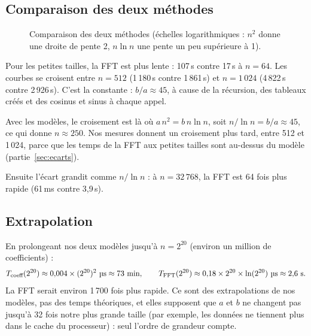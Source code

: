 \documentclass[11pt,a4paper]{article}
\newcommand{\us}{\,\textmu s\xspace}
\begin{document}
\subsection{Comparaison des deux méthodes}

\begin{figure}[H]
\centering
{}
\caption{Comparaison des deux méthodes (échelles logarithmiques : $n^2$ donne une
droite de pente 2, $n \ln n$ une pente un peu supérieure à 1).}
\label{fig:comparaison}
\end{figure}

Pour les petites tailles, la FFT est plus lente : 107\us contre 17\us à $n = 64$. Les
courbes se croisent entre $n = 512$ (1\,180\us contre 1\,861\us) et $n = 1\,024$
(4\,822\us contre 2\,926\us). C'est la constante : $b/a \approx 45$, à cause de la
récursion, des tableaux créés et des cosinus et sinus à chaque appel.

Avec les modèles, le croisement est là où $a\,n^2 = b\,n \ln n$, soit
$n / \ln n = b/a \approx 45$, ce qui donne $n \approx 250$. Nos mesures donnent un
croisement plus tard, entre 512 et 1\,024, parce que les temps de la FFT aux petites
tailles sont au-dessus du modèle (partie~\ref{sec:ecarts}).

Ensuite l'écart grandit comme $n / \ln n$ : à $n = 32\,768$, la FFT est 64 fois plus
rapide (61\,ms contre 3,9\,s).

\subsection{Extrapolation}

En prolongeant nos deux modèles jusqu'à $n = 2^{20}$ (environ un million de
coefficients) :
\[
  T_{\text{coeff}}(2^{20}) \approx 0{,}004 \times (2^{20})^2\ \text{\textmu s} \approx 73\ \text{min},
  \qquad
  T_{\text{FFT}}(2^{20}) \approx 0{,}18 \times 2^{20} \times \ln(2^{20})\ \text{\textmu s} \approx 2{,}6\ \text{s}.
\]
La FFT serait environ 1\,700 fois plus rapide. Ce sont des extrapolations de nos
modèles, pas des temps théoriques, et elles supposent
que $a$ et $b$ ne changent pas jusqu'à 32 fois notre plus grande taille (par exemple, les données ne tiennent plus dans le
cache du processeur) : seul l'ordre de grandeur compte.
\end{document}
